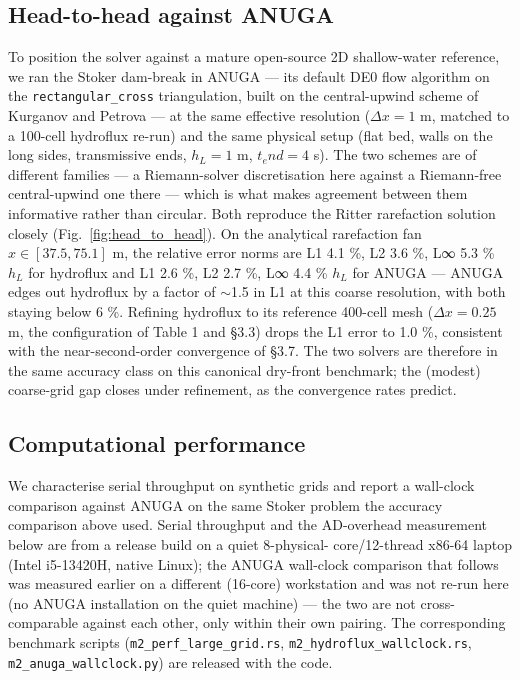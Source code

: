 \subsection{Head-to-head against
ANUGA}

To position the solver against a mature open-source 2D shallow-water
reference, we ran the Stoker dam-break in ANUGA \citep{Roberts2015} ---
its default DE0 flow algorithm on the \texttt{rectangular\_cross}
triangulation, built on the central-upwind scheme of Kurganov and
Petrova \citep{KurganovPetrova2007} --- at the same effective resolution
(\(\Delta x = 1\) m, matched to a 100-cell hydroflux re-run) and the
same physical setup (flat bed, walls on the long sides, transmissive
ends, \(h_L = 1\) m, \(t_end = 4\) s). The two schemes are of different
families --- a Riemann-solver discretisation here against a Riemann-free
central-upwind one there --- which is what makes agreement between them
informative rather than circular. Both reproduce the Ritter rarefaction
solution closely (Fig.~\ref{fig:head_to_head}). On the analytical rarefaction fan
\(x ∈ [37.5, 75.1]\) m, the relative error norms are L1 4.1 \%, L2 3.6
\%, L∞ 5.3 \% \(h_L\) for hydroflux and L1 2.6 \%, L2 2.7 \%, L∞ 4.4 \%
\(h_L\) for ANUGA --- ANUGA edges out hydroflux by a factor of
$\sim$1.5 in L1 at this coarse resolution, with both staying
below 6 \%. Refining hydroflux to its reference 400-cell mesh
(\(\Delta x = 0.25\) m, the configuration of Table 1 and §3.3) drops the
L1 error to 1.0 \%, consistent with the near-second-order convergence of
§3.7. The two solvers are therefore in the same accuracy class on this
canonical dry-front benchmark; the (modest) coarse-grid gap closes under
refinement, as the convergence rates predict.

\subsection{Computational
performance}

We characterise serial throughput on synthetic grids and report a
wall-clock comparison against ANUGA on the same Stoker problem the
accuracy comparison above used. Serial throughput and the AD-overhead
measurement below are from a release build on a quiet 8-physical-
core/12-thread x86-64 laptop (Intel i5-13420H, native Linux); the ANUGA
wall-clock comparison that follows was measured earlier on a different
(16-core) workstation and was not re-run here (no ANUGA installation on
the quiet machine) --- the two are not cross-comparable against each
other, only within their own pairing. The corresponding benchmark
scripts (\texttt{m2\_perf\_large\_grid.rs},
\texttt{m2\_hydroflux\_wallclock.rs}, \texttt{m2\_anuga\_wallclock.py})
are released with the code.

